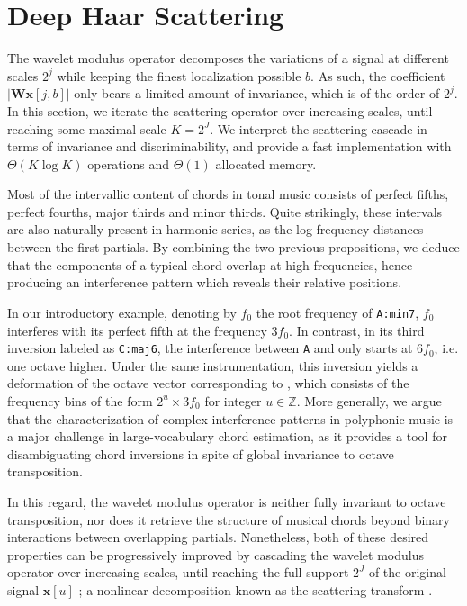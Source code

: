 \documentclass{article}
\makeatletter
\newcommand*{\ie}{i.e.\@\xspace}
\newcommand{\Amin}{\texttt{A:min7}\@\xspace}
\newcommand{\Csix}{\texttt{C:maj6}\@\xspace}
\newcommand{\rootA}{\texttt{A}\@\xspace}
\newcommand{\fifthE}{\text{E}\@\xspace}
\makeatother
\begin{document}
\section{Deep Haar Scattering}\label{sec:scattering}
The wavelet modulus operator decomposes the variations of a signal at
different scales $2^j$ while keeping the finest localization possible $b$.
As such, the coefficient $\vert \mathbf{W} \boldsymbol{x}[j, b] \vert$
only bears a limited amount of invariance, which is of the order
of $2^j$.
In this section, we iterate the scattering operator over increasing scales,
until reaching some maximal scale $K=2^J$.
We interpret the scattering cascade in terms of invariance and discriminability,
and provide a fast implementation with $\Theta(K \log K)$ operations
and $\Theta(1)$ allocated memory.

Most of the intervallic content of chords in tonal music consists of perfect fifths,
perfect fourths, major thirds and minor thirds.
Quite strikingly, these intervals are also naturally present in harmonic series,
as the log-frequency distances between the first partials.
By combining the two previous propositions, we deduce that
the components of a typical chord overlap at high frequencies,
hence producing an interference pattern which reveals their relative positions.

In our introductory example, denoting by $f_0$ the root frequency of \Amin,
$f_0$ interferes with its perfect fifth \fifthE at the frequency $3 f_0$.
In contrast, in its third inversion labeled as \Csix, the interference
between \rootA and \fifthE only starts at $6 f_0$, \ie one octave higher.
Under the same instrumentation, this inversion yields a deformation of the
octave vector corresponding to \fifthE, which consists of the frequency bins
of the form $2^u \times 3 f_0$ for integer $u \in \mathbb{Z}$.
More generally, we argue that the characterization of complex interference patterns
in polyphonic music is a major challenge in large-vocabulary chord estimation,
as it provides a tool for disambiguating chord inversions in spite of global
invariance to octave transposition.

In this regard, the wavelet modulus operator is neither fully invariant to
octave transposition, nor does it retrieve the structure of musical chords beyond
binary interactions between overlapping partials.
Nonetheless, both of these desired properties can be progressively improved
by cascading the wavelet modulus operator over increasing scales, until
reaching the full support $2^J$ of the original signal $\boldsymbol{x}[u]$ ;
a nonlinear decomposition known as the scattering transform \cite{mallat2012group}.
\end{document}
